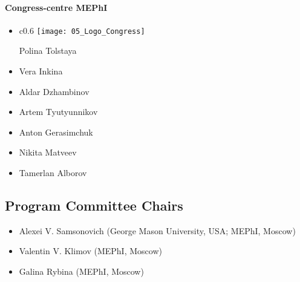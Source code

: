 \documentclass[10pt,fleqn,openany]{book} %
\begin{document}
\paragraph{Congress-centre MEPhI}
		\begin{itemize}
			\item 
			\parbox[t]{\dimexpr\textwidth-\leftmargin}{
				\vspace{-2.5mm}				
				\begin{wrapfigure}{c}{0.6\textwidth}
					\vspace{-2.5mm}
					\centering				
					\texttt{[image: 05\_Logo\_Congress]}
				\end{wrapfigure}
				Polina Tolstaya
			}
			\item Vera Inkina
			\item Aldar Dzhambinov
			\item Artem Tyutyunnikov
			\item Anton Gerasimchuk
			\item Nikita Matveev
			\item Tamerlan Alborov
		\end{itemize}
	
\subsection{Program Committee Chairs}
	\begin{itemize}
		\item Alexei V. Samsonovich (George Mason University, USA; MEPhI, Moscow)
		\item Valentin V. Klimov (MEPhI, Moscow)
		\item Galina Rybina (MEPhI, Moscow)
	\end{itemize}
\end{document}
